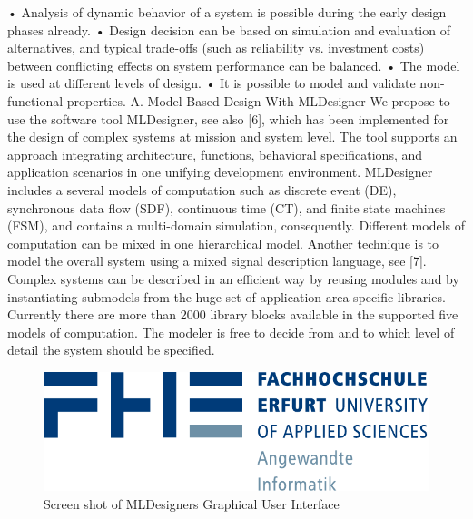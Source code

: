 • Analysis of dynamic behavior of a system is possible
during the early design phases already.
• Design decision can be based on simulation and evaluation of alternatives, and typical trade-offs (such as reliability vs. investment costs) between conflicting effects on
system performance can be balanced.
• The model is used at different levels of design.
• It is possible to model and validate non-functional properties.
A. Model-Based Design With MLDesigner
We propose to use the software tool MLDesigner, see also
[6], which has been implemented for the design of complex
systems at mission and system level. The tool supports an
approach integrating architecture, functions, behavioral specifications, and application scenarios in one unifying development
environment.
MLDesigner includes a several models of computation
such as discrete event (DE), synchronous data flow (SDF),
continuous time (CT), and finite state machines (FSM), and
contains a multi-domain simulation, consequently. Different
models of computation can be mixed in one hierarchical model.
Another technique is to model the overall system using a mixed
signal description language, see [7]. Complex systems can
be described in an efficient way by reusing modules and by
instantiating submodels from the huge set of application-area
specific libraries. Currently there are more than 2000 library
blocks available in the supported five models of computation.
The modeler is free to decide from and to which level of detail
the system should be specified.
\begin{figure}%
    \centering
    \includegraphics[width=.8\linewidth]{images/Logo_Informatik}
    \caption{Screen shot of MLDesigners Graphical User Interface}
    \label{fig:REPLACE}
\end{figure}

